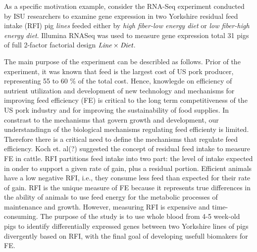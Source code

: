 \documentclass[12pt, letter]{article}\usepackage[]{graphicx}\usepackage[]{color}
\begin{document}
As a specific motivation example, consider the RNA-Seq experiment conducted by ISU  researchers to examine gene expression in two Yorkshire residual feed intake (RFI) pig \emph{lines} feeded either by \emph{high fiber-low energy diet} or \emph{low fiber-high energy diet}. Illumina RNASeq was used to measure gene expression total 31 pigs  of full 2-factor factorial design $\emph{Line} \times \emph{Diet}$. 

The main purpose of the experiment  can be describled as follows. Prior of the experiment, it was known that feed is the largest cost of US pork producer, representing 55 to 60 \% of the total cost. Hence, knowlegde on efficiency of nutrient utilization and development of new technology and mechanisms for improving feed efficiency (FE) is critical to the long term competitiveness of the US pork industry and for improving the sustainability of food supplies. In constrast to the mechanisms that govern  growth and development, our understandingn of the biological mechanisms regulating feed efficienty is limited. Therefore there is a critical need to define the mechanisms that regulate feed efficiency. Koch et. al(?) suggested the concept of residual feed intake to measure FE in cattle. RFI partitions feed intake into two part: the level of intake expected in onder to support a given rate of gain, plus a residual portion. Efficient animals have a low negative RFI, i.e., they consume less feed than expected for their rate of gain. RFI is the unique measure of FE because it represents true differences in the ability of animals to use feed energy for the metabolic processes of maintenance and growth. However, measuring RFI is expensive and time-consuming. The purpose of the study is to use whole blood from 4-5 week-old pigs  to identify differentially expressed genes between two Yorkshire lines of pigs divergently based on RFI, with the final goal of developing usefull biomakers for FE. 
\end{document}
